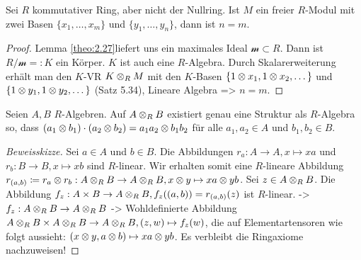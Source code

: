 \documentclass[../main.tex]{subfiles}
\begin{document}
\begin{corollary}
    Sei $R$ kommutativer Ring, aber nicht der Nullring. Ist $M$ ein freier $R$-Modul mit zwei Basen $\{x_1,\dots,x_m\}$ und $\{y_1,\dots,y_n\}$, dann ist $n=m$.
\end{corollary}
\begin{proof}
    Lemma \ref{theo:2.27} liefert uns ein maximales Ideal $\mathcal{m}\subset R$.
    Dann ist $R/\mathcal{m} =: K$ ein Körper. $K$ ist auch eine $R$-Algebra.
    Durch Skalarerweiterung erhält man den $K$-VR $K\otimes_R M$ mit den $K$-Basen $\{1\otimes x_1, 1\otimes x_2,\dots\}$ und $\{1\otimes y_1, 1\otimes y_2,\dots\}$ (Satz 5.34),
    Lineare Algebra => $n=m$.
\end{proof}

\begin{theorem}
    Seien $A,B$ $R$-Algebren.
    Auf $A\otimes_R B$ existiert genau eine Struktur als $R$-Algebra so, dass $(a_1\otimes b_1)\cdot (a_2 \otimes b_2) = a_1a_2 \otimes b_1b_2$ für alle $a_1,a_2\in A$ und $b_1,b_2\in B$.
\end{theorem}
\begin{proof}[Beweisskizze]
    Sei $a\in A$ und $b\in B$.
    Die Abbildungen $r_a:A\rightarrow A, x\mapsto xa$ und $r_b:B\rightarrow B, x\mapsto xb$ sind $R$-linear.
    Wir erhalten somit eine $R$-lineare Abbildung $r_{(a,b)} \coloneqq r_a\otimes r_b: A\otimes_R B \rightarrow A\otimes_R B, x\otimes y\mapsto xa\otimes yb$.
    Sei $z\in A\otimes_R B$. Die Abbildung $f_z: A\times B \rightarrow A\otimes_R B, f_z((a,b)) = r_{(a,b)}(z)$ ist $R$-linear.
    -> $f_z:A\otimes_R B\rightarrow A\otimes_R B$ 
    -> Wohldefinierte Abbildung $A\otimes_R B \times A\otimes_R B \rightarrow A\otimes_R B, (z,w) \mapsto f_z(w)$, die auf Elementartensoren wie folgt aussieht:
    $(x\otimes y, a\otimes b)\mapsto xa\otimes yb$.
    Es verbleibt die Ringaxiome nachzuweisen!
\end{proof}
\end{document}
